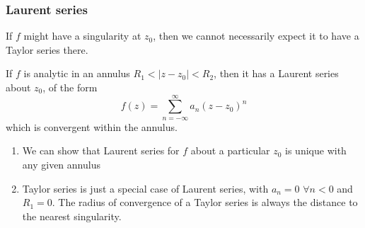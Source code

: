 \documentclass[a4paper]{article}
\begin{document}
\subsubsection{Laurent series}
If $f$ might have a singularity at $z_0$, then we cannot necessarily expect it to have a Taylor series there.
\begin{defi}
If $f$ is analytic in an annulus $R_1<|z-z_0|<R_2$, then it has a Laurent series about $z_0$, of the form
\begin{equation}
f(z)=\sum_{n=-\infty}^\infty a_n(z-z_0)^n\tag{6.6}
\end{equation}
which is convergent within the annulus.
\end{defi}
\begin{remarks}\leavevmode
\begin{enumerate}
    \item We can show that Laurent series for $f$ about a particular $z_0$ is unique with any given annulus
    \item Taylor series is just a special case of Laurent series, with $a_n=0$ $\forall n<0$ and $R_1=0$. The radius of convergence of a Taylor series is always the distance to the nearest singularity.
\end{enumerate}
\end{remarks}
\end{document}
